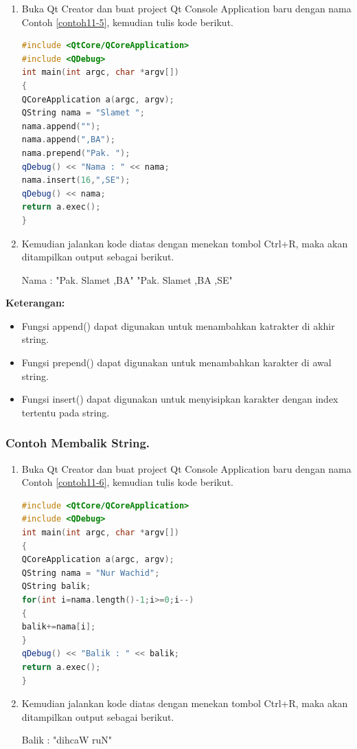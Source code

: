 \begin{enumerate}

\item
  Buka Qt Creator dan buat project Qt Console Application baru dengan
  nama Contoh \ref{contoh11-5}, kemudian tulis kode berikut.

\begin{lstlisting}[language=c++, caption= Menggabungkan String, label=contoh11-5]
#include <QtCore/QCoreApplication>
#include <QDebug>
int main(int argc, char *argv[])
{
QCoreApplication a(argc, argv);
QString nama = "Slamet ";
nama.append("");
nama.append(",BA");
nama.prepend("Pak. ");
qDebug() << "Nama : " << nama;
nama.insert(16,",SE");
qDebug() << nama;
return a.exec();
}
\end{lstlisting}
\item
  Kemudian jalankan kode diatas dengan menekan tombol Ctrl+R, maka akan
  ditampilkan output sebagai berikut.
  
  \begin{lcverbatim}
  Nama :  "Pak. Slamet ,BA"
"Pak. Slamet ,BA ,SE"
  \end{lcverbatim}
\end{enumerate}

\textbf{Keterangan:}

\begin{itemize}

\item
  Fungsi append() dapat digunakan untuk menambahkan katrakter di akhir
  string.
\item
  Fungsi prepend() dapat digunakan untuk menambahkan karakter di awal
  string.
\item
  Fungsi insert() dapat digunakan untuk menyisipkan karakter dengan
  index tertentu pada string.
\end{itemize}

\subsubsection*{Contoh  Membalik String.}

\begin{enumerate}

\item
  Buka Qt Creator dan buat project Qt Console Application baru dengan
  nama Contoh \ref{contoh11-6}, kemudian tulis kode berikut.

\begin{lstlisting}[language=c++, caption= Membalik String, label=contoh11-6]
#include <QtCore/QCoreApplication>
#include <QDebug>
int main(int argc, char *argv[])
{
QCoreApplication a(argc, argv);
QString nama = "Nur Wachid";
QString balik;
for(int i=nama.length()-1;i>=0;i--)
{
balik+=nama[i];
}
qDebug() << "Balik : " << balik;
return a.exec();
}
\end{lstlisting}
\item
  Kemudian jalankan kode diatas dengan menekan tombol Ctrl+R, maka akan
  ditampilkan output sebagai berikut.

  \begin{lcverbatim}
  Balik :  "dihcaW ruN"
  \end{lcverbatim}
\end{enumerate}

